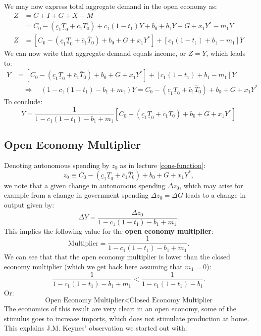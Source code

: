 \documentclass[]{book}
\begin{document}
We may now express total aggregate demand in the open economy as: \[
\begin{aligned}
Z &= C+I+G+X-M\\
&=C_0 -\left(\underline{c}_{1}\underline{T}_0+\bar{c}_{1}\bar{T}_0\right)+c_1 (1-t_1) Y + b_0 +b_1 Y+G+x_1 Y^{*} -m_1 Y\\
Z&=\left[ C_0 -\left(\underline{c}_{1}\underline{T}_0+\bar{c}_{1}\bar{T}_0\right)+ b_0 + G + x_1 Y^{*}\right]+\left[c_1 (1-t_1) + b_1 - m_1\right]Y
\end{aligned}
\] We can now write that aggregate demand equals income, or \(Z = Y\),
which leads to: \[
\begin{aligned}
Y &= \left[ C_0 -\left(\underline{c}_{1}\underline{T}_0+\bar{c}_{1}\bar{T}_0\right)+ b_0 + G + x_1 Y^{*}\right]+\left[c_1 (1-t_1) + b_1 - m_1\right]Y\\
&\quad \Rightarrow \quad (1-c_1(1-t_1)-b_1+m_1)Y = C_0 -\left(\underline{c}_{1}\underline{T}_0+\bar{c}_{1}\bar{T}_0\right)+ b_0 + G + x_1 Y^{*}
\end{aligned}
\] To conclude:
\[\boxed{Y = \frac{1}{1-c_1(1-t_1)-b_1+m_1} \left[C_0 -\left(\underline{c}_{1}\underline{T}_0+\bar{c}_{1}\bar{T}_0\right)+ b_0 + G + x_1 Y^{*}\right]}\]

\subsection{Open Economy Multiplier}\label{open-economy-multiplier}

Denoting autonomous spending by \(z_0\) as in lecture
\ref{cons-function}:
\[z_0 \equiv C_0 -\left(\underline{c}_{1}\underline{T}_0+\bar{c}_{1}\bar{T}_0\right)+ b_0 + G + x_1 Y^{*},\]
we note that a given change in autonomous spending \(\Delta z_0\), which
may arise for example from a change in government spending
\(\Delta z_0 = \Delta G\) leads to a change in output given by:
\[\Delta Y = \frac{\Delta z_0}{1-c_1(1-t_1)-b_1+m_1}.\] This implies the
following value for the \textbf{open economy multiplier}:
\[\boxed{\text{Multiplier} = \frac{1}{1-c_1(1-t_1)-b_1+m_1}}.\] We can
see that that the open economy multiplier is lower than the closed
economy multiplier (which we get back here assuming that \(m_1 = 0\)):
\[\frac{1}{1-c_1(1-t_1)-b_1+m_1}<\frac{1}{1-c_1(1-t_1)-b_1}.\] Or:
\[\boxed{\text{Open Economy Multiplier} < \text{Closed Economy Multiplier}}\]
The economics of this result are very clear: in an open economy, some of
the stimulus goes to increase imports, which does not stimulate
production at home. This explains J.M. Keynes' observation we started
out with:
\end{document}
